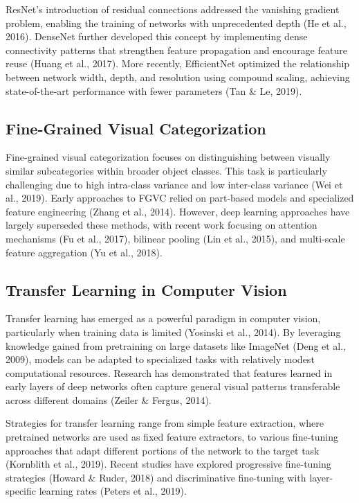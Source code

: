 \documentclass[
]{article}
\begin{document}
ResNet's introduction of residual connections addressed the vanishing
gradient problem, enabling the training of networks with unprecedented
depth (He et al., 2016). DenseNet further developed this concept by
implementing dense connectivity patterns that strengthen feature
propagation and encourage feature reuse (Huang et al., 2017). More
recently, EfficientNet optimized the relationship between network width,
depth, and resolution using compound scaling, achieving state-of-the-art
performance with fewer parameters (Tan \& Le, 2019).

\subsection{Fine-Grained Visual
Categorization}\label{fine-grained-visual-categorization}

Fine-grained visual categorization focuses on distinguishing between
visually similar subcategories within broader object classes. This task
is particularly challenging due to high intra-class variance and low
inter-class variance (Wei et al., 2019). Early approaches to FGVC relied
on part-based models and specialized feature engineering (Zhang et al.,
2014). However, deep learning approaches have largely superseded these
methods, with recent work focusing on attention mechanisms (Fu et al.,
2017), bilinear pooling (Lin et al., 2015), and multi-scale feature
aggregation (Yu et al., 2018).

\subsection{Transfer Learning in Computer
Vision}\label{transfer-learning-in-computer-vision}

Transfer learning has emerged as a powerful paradigm in computer vision,
particularly when training data is limited (Yosinski et al., 2014). By
leveraging knowledge gained from pretraining on large datasets like
ImageNet (Deng et al., 2009), models can be adapted to specialized tasks
with relatively modest computational resources. Research has
demonstrated that features learned in early layers of deep networks
often capture general visual patterns transferable across different
domains (Zeiler \& Fergus, 2014).

Strategies for transfer learning range from simple feature extraction,
where pretrained networks are used as fixed feature extractors, to
various fine-tuning approaches that adapt different portions of the
network to the target task (Kornblith et al., 2019). Recent studies have
explored progressive fine-tuning strategies (Howard \& Ruder, 2018) and
discriminative fine-tuning with layer-specific learning rates (Peters et
al., 2019).
\end{document}
